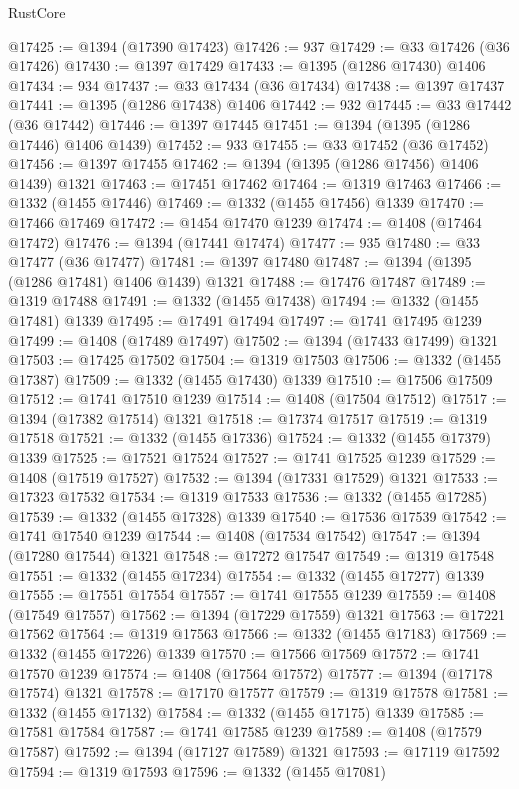 \begin{lexlean}{RustCore}
\begin{coremodule}
@17425 := @1394 (@17390 @17423)
@17426 := 937
@17429 := @33 @17426 (@36 @17426)
@17430 := @1397 @17429
@17433 := @1395 (@1286 @17430) @1406
@17434 := 934
@17437 := @33 @17434 (@36 @17434)
@17438 := @1397 @17437
@17441 := @1395 (@1286 @17438) @1406
@17442 := 932
@17445 := @33 @17442 (@36 @17442)
@17446 := @1397 @17445
@17451 := @1394 (@1395 (@1286 @17446) @1406 @1439)
@17452 := 933
@17455 := @33 @17452 (@36 @17452)
@17456 := @1397 @17455
@17462 := @1394 (@1395 (@1286 @17456) @1406 @1439) @1321
@17463 := @17451 @17462
@17464 := @1319 @17463
@17466 := @1332 (@1455 @17446)
@17469 := @1332 (@1455 @17456) @1339
@17470 := @17466 @17469
@17472 := @1454 @17470 @1239
@17474 := @1408 (@17464 @17472)
@17476 := @1394 (@17441 @17474)
@17477 := 935
@17480 := @33 @17477 (@36 @17477)
@17481 := @1397 @17480
@17487 := @1394 (@1395 (@1286 @17481) @1406 @1439) @1321
@17488 := @17476 @17487
@17489 := @1319 @17488
@17491 := @1332 (@1455 @17438)
@17494 := @1332 (@1455 @17481) @1339
@17495 := @17491 @17494
@17497 := @1741 @17495 @1239
@17499 := @1408 (@17489 @17497)
@17502 := @1394 (@17433 @17499) @1321
@17503 := @17425 @17502
@17504 := @1319 @17503
@17506 := @1332 (@1455 @17387)
@17509 := @1332 (@1455 @17430) @1339
@17510 := @17506 @17509
@17512 := @1741 @17510 @1239
@17514 := @1408 (@17504 @17512)
@17517 := @1394 (@17382 @17514) @1321
@17518 := @17374 @17517
@17519 := @1319 @17518
@17521 := @1332 (@1455 @17336)
@17524 := @1332 (@1455 @17379) @1339
@17525 := @17521 @17524
@17527 := @1741 @17525 @1239
@17529 := @1408 (@17519 @17527)
@17532 := @1394 (@17331 @17529) @1321
@17533 := @17323 @17532
@17534 := @1319 @17533
@17536 := @1332 (@1455 @17285)
@17539 := @1332 (@1455 @17328) @1339
@17540 := @17536 @17539
@17542 := @1741 @17540 @1239
@17544 := @1408 (@17534 @17542)
@17547 := @1394 (@17280 @17544) @1321
@17548 := @17272 @17547
@17549 := @1319 @17548
@17551 := @1332 (@1455 @17234)
@17554 := @1332 (@1455 @17277) @1339
@17555 := @17551 @17554
@17557 := @1741 @17555 @1239
@17559 := @1408 (@17549 @17557)
@17562 := @1394 (@17229 @17559) @1321
@17563 := @17221 @17562
@17564 := @1319 @17563
@17566 := @1332 (@1455 @17183)
@17569 := @1332 (@1455 @17226) @1339
@17570 := @17566 @17569
@17572 := @1741 @17570 @1239
@17574 := @1408 (@17564 @17572)
@17577 := @1394 (@17178 @17574) @1321
@17578 := @17170 @17577
@17579 := @1319 @17578
@17581 := @1332 (@1455 @17132)
@17584 := @1332 (@1455 @17175) @1339
@17585 := @17581 @17584
@17587 := @1741 @17585 @1239
@17589 := @1408 (@17579 @17587)
@17592 := @1394 (@17127 @17589) @1321
@17593 := @17119 @17592
@17594 := @1319 @17593
@17596 := @1332 (@1455 @17081)

\end{coremodule}
\end{lexlean}
